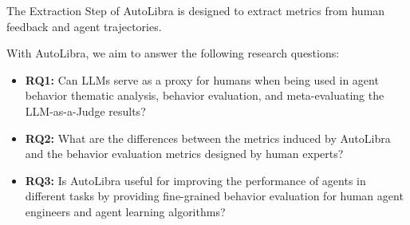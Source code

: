 The Extraction Step of AutoLibra is designed to extract metrics from human feedback and agent trajectories.


With AutoLibra, we aim to answer the following research questions:
\begin{itemize}
    \item \textbf{RQ1:} Can LLMs serve as a proxy for humans when being used in agent behavior thematic analysis,
    behavior evaluation, and meta-evaluating the LLM-as-a-Judge results?
    \item \textbf{RQ2:} What are the differences between the metrics induced by AutoLibra and the behavior evaluation
    metrics designed by human experts?
    \item \textbf{RQ3:} Is AutoLibra useful for improving the performance of agents in different tasks by 
    providing fine-grained behavior evaluation for human agent engineers and agent learning algorithms?
\end{itemize}


